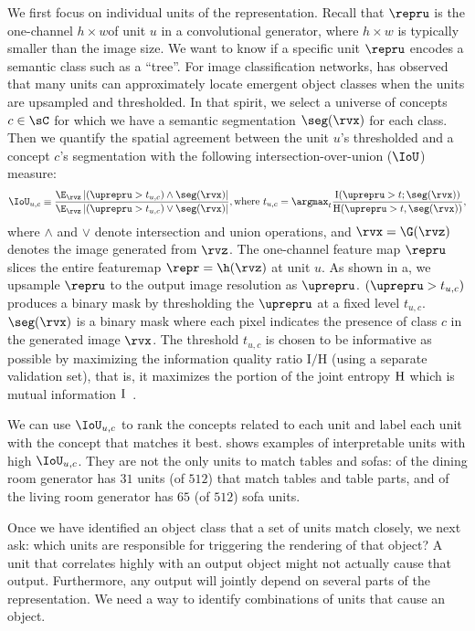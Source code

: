 \documentclass{article} %
\begin{document}
We first focus on individual units of the representation. Recall that $\repru$ is the one-channel $h\times w$\featuremap of unit $u$ in a convolutional generator, where $h\times w$ is typically smaller than the image size.
We want to know if a specific unit $\repru$ encodes a semantic class such as a ``tree''.  For image classification networks, \citet{bau2017network} has observed that many units can approximately locate emergent object classes when the units are upsampled and thresholded. In that spirit, we select a universe of concepts $c\in\sC$ for which we have a semantic segmentation $\seg(\rvx)$ for each class.  Then we quantify the spatial agreement between the unit $u$'s thresholded \featuremap and a concept $c$'s segmentation with the following intersection-over-union ($\IoU$) measure:
\begin{align}
\IoU_{u,c} \equiv
\frac{\E_{\rvz} \left|(\uprepru > t_{u,c}) \land  \seg(\rvx) \right|}
{\E_{\rvz} \left|(\uprepru > t_{u,c}) \vee \seg(\rvx) \right|},
\mbox{where } t_{u,c} = \argmax_{t} \frac{\text{I}(\uprepru > t ; \seg(\rvx))}{\text{H}(\uprepru > t , \seg(\rvx))},
\label{eq:max-iqr}
\end{align}
where $\land$ and $\vee$ denote intersection and union operations, and $\rvx=\G(\rvz)$ denotes the image generated from $\rvz$. The one-channel feature map $\repru$ slices the entire featuremap $\repr=\h(\rvz)$ at unit $u$. As shown in a, we upsample $\repru$ to the output image resolution as $\uprepru$. $(\uprepru > t_{u,c})$ produces a binary mask by thresholding the $\uprepru$  at a fixed level $t_{u,c}$.
$\seg(\rvx)$ is a binary mask where each pixel indicates the presence of class $c$  in the generated image $\rvx$.
The threshold $t_{u,c}$ is chosen to be informative as possible by maximizing the information quality ratio $\text{I} / \text{H}$ (using a separate validation set), that is, it maximizes the portion of the joint entropy $\textnormal{H}$ which is mutual information $\textnormal{I}$~\citep{wijaya2017information}.


We can use $\IoU_{u,c}$ to rank the concepts related to each unit and label each unit with the concept that matches it best.
 shows examples of interpretable units with high $\IoU_{u, c}$.
They are not the only units to match tables and sofas:  of the dining room generator has $31$ units (of $512$) that match tables and table parts, and  of the living room generator has $65$ (of $512$) sofa units.

Once we have identified an object class that a set of units match closely, we next ask: which units are responsible for triggering the rendering of that object?  A unit that correlates highly with an output object might not actually cause that output.  Furthermore, any output will jointly depend on several parts of the representation. We need a way to identify combinations of units that cause an object.
\end{document}
